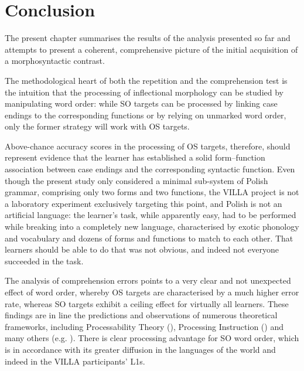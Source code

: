 \chapter{Conclusion}\label{sec:8}

The present chapter summarises the results of the analysis presented so far and attempts to present a coherent, comprehensive picture of the initial acquisition of a morphosyntactic contrast.

The methodological heart of both the repetition and the comprehension test is the intuition that the processing of inflectional morphology can be studied by manipulating word order: while SO targets can be processed by linking case endings to the corresponding functions or by relying on unmarked word order, only the former strategy will work with OS targets. 

Above-chance accuracy scores in the processing of OS targets, therefore, should represent evidence that the learner has established a solid form–function association between case endings and the corresponding syntactic function. Even though the present study only considered a minimal sub-system of Polish grammar, comprising only two forms and two functions, the VILLA project is not a laboratory experiment exclusively targeting this point, and Polish is not an artificial language: the learner’s task, while apparently easy, had to be performed while breaking into a completely new language, characterised by exotic phonology and vocabulary and dozens of forms and functions to match to each other. That learners should be able to do that was not obvious, and indeed not everyone succeeded in the task. 

The analysis of comprehension errors points to a very clear and not unexpected effect of word order, whereby OS targets are characterised by a much higher error rate, whereas SO targets exhibit a ceiling effect for virtually all learners. These findings are in line the predictions and observations of numerous theoretical frameworks, including Processability Theory (\citealt{Pienemann1998, Baten2013, ArtoniMagnani2015}), Processing Instruction (\citealt{VanPatten1984, VanPatten1996, VanPattenEtAl2013}) and many others (e.g. \citealt{KempeMacWhinney1998, Jackson2007, HenryEtAl2009, Rankin2014}). There is clear processing advantage for SO word order, which is in accordance with its greater diffusion in the languages of the world and indeed in the VILLA participants’ L1s.

